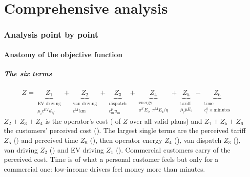 
\clearpage
\part{Comprehensive analysis}
\section{Analysis point by point}

\subsection{Anatomy of the objective function}
\label{sec:anatomy}

\subsubsection{The six terms}
\[
Z=\underbrace{Z_1}_{\substack{\text{EV driving}\\\mu_i c^{\mathrm{EV}} d_{if}}}+\underbrace{Z_2}_{\substack{\text{van driving}\\ c^{\mathrm M}\,\text{km}}}+\underbrace{Z_3}_{\substack{\text{dispatch}\\ c^{\mathrm F}_m u_m}}+\underbrace{Z_4}_{\substack{\text{energy}\\ \pi^{\mathrm F}E_i,\ \pi^{\mathrm M}E_i/\eta}}+\underbrace{Z_5}_{\substack{\text{tariff}\\ \mu_i p E_i}}+\underbrace{Z_6}_{\substack{\text{time}\\ c^{a}_i\times\text{minutes}}}
\]
$Z_2+Z_3+Z_4$ is the operator's cost (\ZOperator\pct{} of $Z$ over all valid plans) and $Z_1+Z_5+Z_6$ the customers' perceived cost (\ZCustomer\pct). The largest single terms are the perceived tariff $Z_5$ (\ZFive\pct) and perceived time $Z_6$ (\ZSix\pct), then operator energy $Z_4$ (\ZFour\pct), van dispatch $Z_3$ (\ZThree\pct), van driving $Z_2$ (\ZTwo\pct) and EV driving $Z_1$ (\ZOne\pct). Commercial customers carry \CustShareComm\pct{} of the perceived cost. Time is \TimeShareCustPers\pct{} of what a personal customer feels but only \TimeShareCustComm\pct{} for a commercial one: low-income drivers feel money more than minutes.

